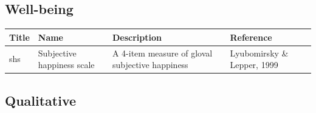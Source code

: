 \documentclass[]{book}
\begin{document}
\hypertarget{well-being}{%
\subsection{Well-being}\label{well-being}}

\begin{longtable}[]{@{}llll@{}}
\toprule
\begin{minipage}[b]{0.22\columnwidth}\raggedright
Title\strut
\end{minipage} & \begin{minipage}[b]{0.27\columnwidth}\raggedright
Name\strut
\end{minipage} & \begin{minipage}[b]{0.22\columnwidth}\raggedright
Description\strut
\end{minipage} & \begin{minipage}[b]{0.18\columnwidth}\raggedright
Reference\strut
\end{minipage}\tabularnewline
\midrule
\endhead
\begin{minipage}[t]{0.22\columnwidth}\raggedright
shs\strut
\end{minipage} & \begin{minipage}[t]{0.27\columnwidth}\raggedright
Subjective happiness scale\strut
\end{minipage} & \begin{minipage}[t]{0.22\columnwidth}\raggedright
A 4-item measure of gloval subjective happiness\strut
\end{minipage} & \begin{minipage}[t]{0.18\columnwidth}\raggedright
Lyubomirsky \& Lepper, 1999\strut
\end{minipage}\tabularnewline
\bottomrule
\end{longtable}

\hypertarget{qualitative}{%
\subsection{Qualitative}\label{qualitative}}
\end{document}
